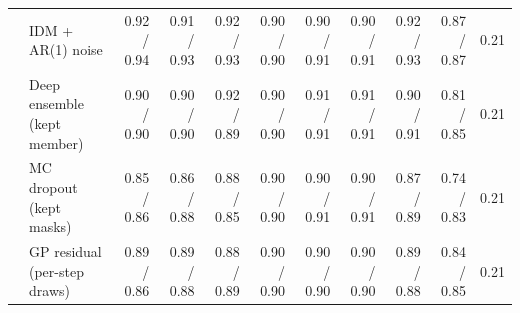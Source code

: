 \begin{longtable}{llrrrrrrrrr}
 & IDM + AR(1) noise & 0.92 / 0.94 & 0.91 / 0.93 & 0.92 / 0.93 & 0.90 / 0.90 & 0.90 / 0.91 & 0.90 / 0.91 & 0.92 / 0.93 & 0.87 / 0.87 & 0.21 \\
 & Deep ensemble (kept member) & 0.90 / 0.90 & 0.90 / 0.90 & 0.92 / 0.89 & 0.90 / 0.90 & 0.91 / 0.91 & 0.91 / 0.91 & 0.90 / 0.91 & 0.81 / 0.85 & 0.21 \\
 & MC dropout (kept masks) & 0.85 / 0.86 & 0.86 / 0.88 & 0.88 / 0.85 & 0.90 / 0.90 & 0.90 / 0.91 & 0.90 / 0.91 & 0.87 / 0.89 & 0.74 / 0.83 & 0.21 \\
 & GP residual (per-step draws) & 0.89 / 0.86 & 0.89 / 0.88 & 0.88 / 0.89 & 0.90 / 0.90 & 0.90 / 0.90 & 0.90 / 0.90 & 0.89 / 0.88 & 0.84 / 0.85 & 0.21 \\
\end{longtable}
\endgroup
